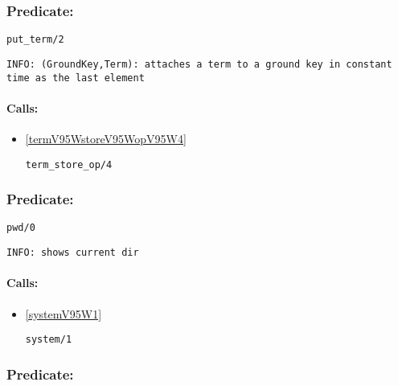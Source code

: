 \subsubsection{Predicate:} \label{putV95WtermV95W2}

\begin{verbatim}
put_term/2
\end{verbatim}

{\small \begin{verbatim}
INFO: (GroundKey,Term): attaches a term to a ground key in constant time as the last element

\end{verbatim}}
\paragraph{Calls:} 
\begin{itemize}
\item \ref{termV95WstoreV95WopV95W4} 
\begin{verbatim}
term_store_op/4
\end{verbatim}

\end{itemize}

\subsubsection{Predicate:} \label{pwdV95W0}

\begin{verbatim}
pwd/0
\end{verbatim}

{\small \begin{verbatim}
INFO: shows current dir

\end{verbatim}}
\paragraph{Calls:} 
\begin{itemize}
\item \ref{systemV95W1} 
\begin{verbatim}
system/1
\end{verbatim}

\end{itemize}

\subsubsection{Predicate:} \label{pwdV95W1}

